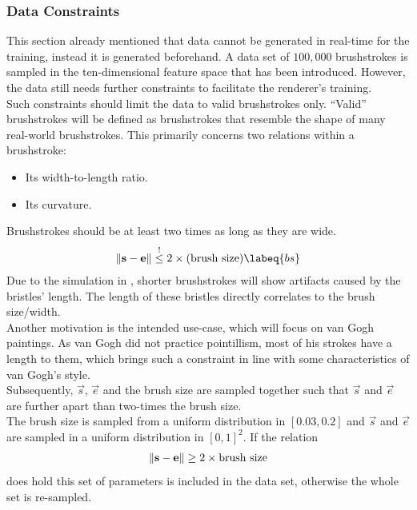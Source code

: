 \subsubsection{Data Constraints}
This section already mentioned that data cannot be generated in real-time for the training, instead it is generated beforehand.
A data set of $100,000$ brushstrokes is sampled in the ten-dimensional feature space that has been introduced.
However, the data still needs further constraints to facilitate the renderer's training.\\
Such constraints should limit the data to valid brushstrokes only.
``Valid'' brushstrokes will be defined as brushstrokes that resemble the shape of many real-world brushstrokes.
This primarily concerns two relations within a brushstroke:
\begin{itemize}
    \item Its width-to-length ratio.
    \item Its curvature.
\end{itemize}

Brushstrokes should be at least two times as long as they are wide.
\begin{align}
    \norm{\vec{s} - \vec{e}} \overset{!}{\leq}  2 \times (\text{brush size}) \labeq{bs}
\end{align}
Due to the simulation in , shorter brushstrokes will show artifacts caused by the bristles' length.
The length of these bristles directly correlates to the brush size/width.\\
Another motivation is the intended use-case, which will focus on van Gogh paintings.
As van Gogh did not practice pointillism, most of his strokes have a length to them, which brings such a constraint in line with some characteristics of van Gogh's style.\\
Subsequently, $\vec{s}$, $\vec{e}$ and the brush size are sampled together such that $\vec{s}$ and $\vec{e}$ are further apart than two-times the brush size.\\
The brush size is sampled from a uniform distribution in $[0.03, 0.2]$ and $\vec{s}$ and $\vec{e}$ are sampled in a uniform distribution in $[0, 1]^2$.
If the relation
\begin{align}
    \left\lVert\mathbf{s} - \mathbf{e}\right\rVert \geq 2 \times \text{brush size}
\end{align}
does hold this set of parameters is included in the data set, otherwise the whole set is re-sampled.

